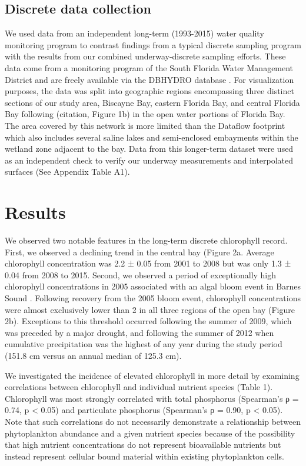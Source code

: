 \documentclass[review]{elsarticle}
\begin{document}
\subsection{Discrete data collection}

We used data from an independent long-term (1993-2015) water quality monitoring program to contrast findings from a typical discrete sampling program with the results from our combined underway-discrete sampling efforts. These data come from a monitoring program of the South Florida Water Management District and are freely available via the DBHYDRO database . For visualization purposes, the data was split into geographic regions encompassing three distinct sections of our study area, Biscayne Bay, eastern Florida Bay, and central Florida Bay following (citation, Figure 1b) in the open water portions of Florida Bay. The area covered by this network is more limited than the Dataflow footprint which also includes several saline lakes and semi-enclosed embayments within the wetland zone adjacent to the bay. Data from this longer-term dataset were used as an independent check to verify our underway measurements and interpolated surfaces (See Appendix Table A1).

\section{Results}

We observed two notable features in the long-term discrete chlorophyll record. First, we observed a declining trend in the central bay (Figure 2a. Average chlorophyll concentration was 2.2 ± 0.05 from 2001 to 2008 but was only 1.3 ± 0.04 from 2008 to 2015. Second, we observed a period of exceptionally high chlorophyll concentrations in 2005 associated with an algal bloom event in Barnes Sound . Following recovery from the 2005 bloom event, chlorophyll concentrations were almost exclusively lower than 2 in all three regions of the open bay (Figure 2b). Exceptions to this threshold occurred following the summer of 2009, which was preceded by a major drought, and following the summer of 2012 when cumulative precipitation was the highest of any year during the study period (151.8 cm versus an annual median of 125.3 cm).

We investigated the incidence of elevated chlorophyll in more detail by examining correlations between chlorophyll and individual nutrient species (Table 1). Chlorophyll was most strongly correlated with total phosphorus (Spearman’s ρ = 0.74, p < 0.05) and particulate phosphorus (Spearman’s ρ = 0.90, p < 0.05). Note that such correlations do not necessarily demonstrate a relationship between phytoplankton abundance and a given nutrient species because of the possibility that high nutrient concentrations do not represent bioavailable nutrients but instead represent cellular bound material within existing phytoplankton cells.  
\end{document}
